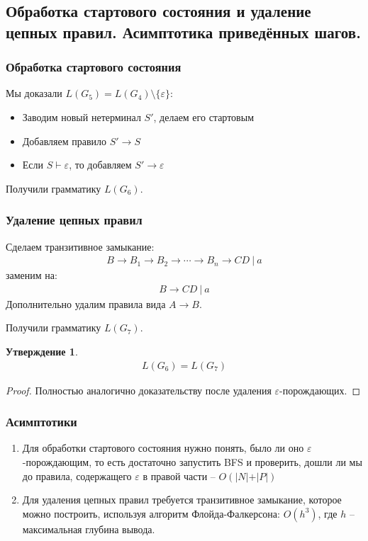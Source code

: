 \documentclass[a4paper,12pt]{article}
\theoremstyle{plain}
\newtheorem{proposition}{Утверждение}[subsection]
\theoremstyle{definition}
\theoremstyle{remark}
\begin{document}
\subsection{Обработка стартового состояния и удаление цепных правил. Асимптотика приведённых шагов.}
\subsubsection*{Обработка стартового состояния}
Мы доказали $L(G_5) = L(G_4) \setminus \{\varepsilon\}$:
\begin{itemize}
	\item Заводим новый нетерминал $S'$, делаем его стартовым
	\item Добавляем правило $S' \to S$
	\item Если $S \vdash \varepsilon$, то добавляем $S' \to \varepsilon$
\end{itemize}

Получили грамматику $L(G_6)$.

\subsubsection*{Удаление цепных правил}
Сделаем транзитивное замыкание:
\begin{align*}
	B \to B_1 \to B_2 \to \cdots \to B_n \to CD \:|\: a
\end{align*}
заменим на:
\begin{align*}
	B \to CD \:|\: a
\end{align*}
Дополнительно удалим правила вида $A \to B$.

Получили грамматику $L(G_7)$.

\begin{proposition}
	\begin{align*}
		L(G_6) = L(G_7)
	\end{align*}
\end{proposition}

\begin{proof}
	Полностью аналогично доказательству после удаления $\varepsilon$-порождающих.
\end{proof}

\subsubsection*{Асимптотики}
\begin{enumerate}
	\item Для обработки стартового состояния нужно понять, было ли оно $\varepsilon$-порождающим, то есть достаточно запустить BFS и проверить, дошли ли мы до правила, содержащего $\varepsilon$ в правой части -- $O(\vert N\vert + \vert P\vert)$
	\item Для удаления цепных правил требуется транзитивное замыкание, которое можно построить, используя алгоритм Флойда-Фалкерсона: $O(h^3)$, где $h$ -- максимальная глубина вывода.
\end{enumerate}
\end{document}
